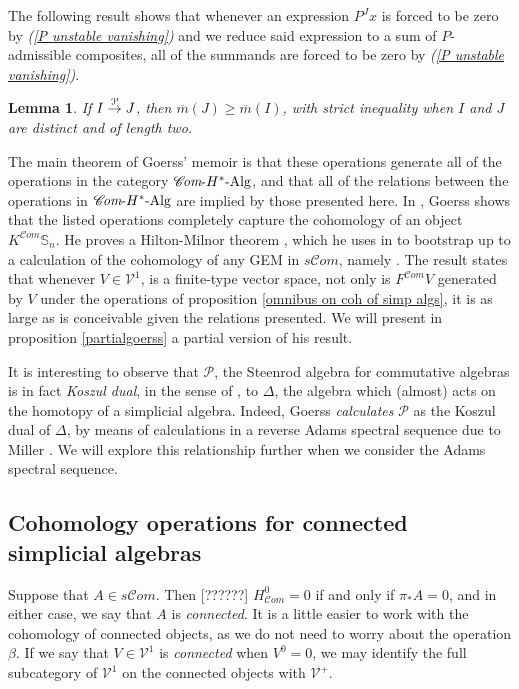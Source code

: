 \documentclass[11pt]{amsart}
\theoremstyle{plain}
\newtheorem{lem}[thm]{Lemma}
\theoremstyle{definition}
\newcommand{\scrC}{\mathscr{C}}
\newcommand{\calP}{\mathcal{P}}
\newcommand{\calV}{\mathcal{V}}
\theoremstyle{plain}
\newcommand{\Palg}{{\calP}}
\newcommand{\deltaalg}{\Delta} %
\newcommand{\vect}[2]{\calV^{#1}_{#2}}
\newcommand{\HAlg}{\textup{-$H^*$-Alg}}
\newcommand{\minDimP}{\overline{m}}
\newcommand{\produces}[3]{#3:#1\sim #2}
\renewcommand{\produces}[3]{#1\rightarrow_{#3} #2}%
\renewcommand{\produces}[3]{#1\overset{\smash{#3}}{\rightarrow} #2}%
\newcommand{\algs}{\scrC\!\textit{om}}
\begin{document}
\begin{Constructing homotopy and cohomotopy operations}
The following result shows that whenever an expression $P^Jx$ is forced to be zero by \emph{(\ref{P unstable vanishing})}  and we reduce said expression to a sum of $P$-admissible composites, all of the summands are forced to be zero by \emph{(\ref{P unstable vanishing})}.
\begin{lem}\label{lemOnAdemChangeInMP}
If $\produces{I}{J}{\Palg}$, then $\minDimP(J) \geq \minDimP(I)$, with strict inequality when $I$ and $J$ are distinct and of length two.
\end{lem}
The main theorem of Goerss' memoir is that these operations generate all of the operations in the category $\algs\HAlg$, and that all of the relations between the operations in $\algs\HAlg$ are implied by those presented here. In \cite[Chapter V]{MR1089001}, Goerss shows that the listed operations completely capture the cohomology of an object $K^{\algs}\mathbb{S}_n$. He proves a Hilton-Milnor theorem \cite{GoerssHiltonMilnor.pdf}, which he uses in \cite[\S11]{MR1089001} to bootstrap up to a calculation of the cohomology of any GEM in $s\algs$, namely \cite[Theorem I]{MR1089001}. The result states that whenever $V\in \vect{1}{}$,  is a finite-type vector space, not only is 
$F^{\algs}V$
generated by $V$ under the operations of proposition \ref{omnibus on coh of simp algs}, it is as large as is conceivable given the relations presented. We will present in proposition \ref{partialgoerss} a partial version of his result.

It is  interesting to observe that $\Palg$, the Steenrod algebra for commutative algebras is
in fact \emph{Koszul dual}, in the sense of \cite{PriddyKoszul.pdf}, to $\deltaalg$, the algebra which (almost) acts on the homotopy of a simplicial algebra. Indeed, Goerss \emph{calculates} $\Palg$ as the Koszul dual of $\deltaalg$, by means of calculations in a reverse Adams spectral sequence due to Miller \cite{MillerSullivanConjecture.pdf}. We will explore this relationship further when we consider the Adams spectral sequence.

\subsection{Cohomology operations for connected simplicial algebras}
Suppose that $A\in s\algs$. Then [??????] $H^0_{\algs}=0$ if and only if $\pi_*A=0$, and in either case, we say that $A$ is \emph{connected}. It is a little easier to work with the cohomology of connected objects, as we do not need to worry about the operation $\beta$. If we say that $V\in \vect{1}{}$ is \emph{connected} when $V^{0}=0$, we may identify the full subcategory of $\vect{1}{}$ on the connected objects with $\vect{+}{}$.


\end{Constructing homotopy and cohomotopy operations}
\end{document}
